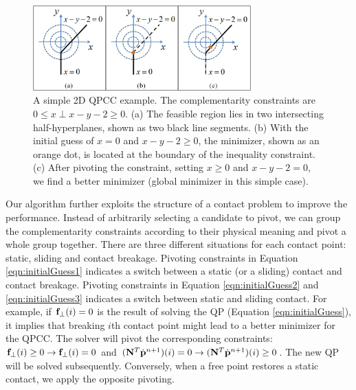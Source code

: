 \begin{figure}[!b]
  \centering
  \includegraphics[width=3.3in]{figures/QPCC.eps}
  \caption{A simple 2D QPCC example. The complementarity constraints are $0\leq x \perp x-y-2 \geq 0$. (a) The feasible region lies in two intersecting half-hyperplanes, shown as two black line segments. (b) With the initial guess of $x=0$ and $x-y-2\geq 0$, the minimizer, shown as an orange dot, is located at the boundary of the inequality constraint. (c) After pivoting the constraint, setting $x\geq 0$ and $x-y-2=0$, we find a better minimizer (global minimizer in this simple case).}
  \label{fig:QPCC}
\end{figure}

Our algorithm further exploits the structure of a contact problem to
improve the performance. Instead of arbitrarily selecting a candidate
to pivot, we can group the complementarity constraints according to
their physical meaning and pivot a whole group together. There are
three different situations for each contact point: static, sliding and
contact breakage. Pivoting constraints in Equation
\ref{eqn:initialGuess1} indicates a switch between a static (or a
sliding) contact and contact breakage.  Pivoting constraints in
Equation \ref{eqn:initialGuess2} and \ref{eqn:initialGuess3}
indicates a switch between static and sliding contact. For example, if
$\mathbf{f}_{\perp}(i)=0$ is the result of solving the QP (Equation
\ref{eqn:initialGuess}), it implies that breaking $i$th contact point
might lead to a better minimizer for the QPCC. The solver will pivot
the corresponding constraints: $\mathbf{f}_{\perp}(i) \geq 0 \rightarrow
\mathbf{f}_{\perp}(i) = 0$ and $(\mathbf{N}^T\dot{\mathbf{p}}^{n+1})(i) = 0
\rightarrow (\mathbf{N}^T\dot{\mathbf{p}}^{n+1})(i) \geq 0$. The new QP will
be solved subsequently. Conversely, when a free point restores a static
contact, we apply the opposite pivoting.


